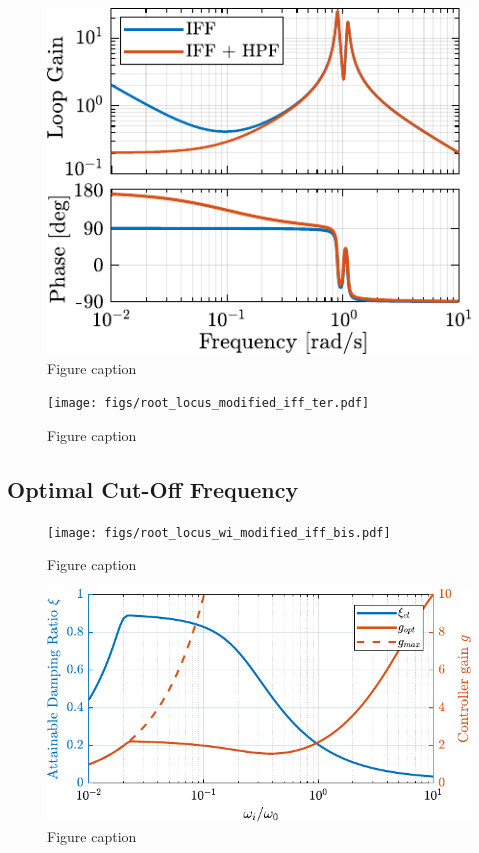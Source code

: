 \documentclass{ISMA_USD2020}
\begin{document}
\begin{figure}[htbp]
\centering
\includegraphics[scale=1]{figs/loop_gain_modified_iff.pdf}
\caption{\label{fig:loop_gain_modified_iff}Figure caption}
\end{figure}

\begin{figure}[htbp]
\centering
\texttt{[image: figs/root\_locus\_modified\_iff\_ter.pdf]}
\caption{\label{fig:root_locus_modified_iff}Figure caption}
\end{figure}

\subsection{Optimal Cut-Off Frequency}
\label{sec:org9808de1}

\begin{figure}[htbp]
\centering
\texttt{[image: figs/root\_locus\_wi\_modified\_iff\_bis.pdf]}
\caption{\label{fig:root_locus_wi_modified_iff}Figure caption}
\end{figure}


\begin{figure}[htbp]
\centering
\includegraphics[scale=1]{figs/mod_iff_damping_wi.pdf}
\caption{\label{fig:mod_iff_damping_wi}Figure caption}
\end{figure}
\end{document}
